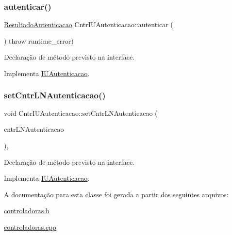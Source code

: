 \subsubsection{\texorpdfstring{autenticar()}{autenticar()}}
{\footnotesize\ttfamily \hyperlink{class_resultado_autenticacao}{Resultado\+Autenticacao} Cntr\+I\+U\+Autenticacao\+::autenticar (\begin{DoxyParamCaption}{ }\end{DoxyParamCaption}) throw  runtime\+\_\+error) \hspace{0.3cm}{\ttfamily [virtual]}}

Declaração de método previsto na interface. 

Implementa \hyperlink{class_i_u_autenticacao_ac963b141bda437bfd3ac425e9e6b9898}{I\+U\+Autenticacao}.

\mbox{\label{class_cntr_i_u_autenticacao_a4ee05cc87ef8cf13e9ba6a3390ac1943}} 
\subsubsection{\texorpdfstring{set\+Cntr\+L\+N\+Autenticacao()}{setCntrLNAutenticacao()}}
{\footnotesize\ttfamily void Cntr\+I\+U\+Autenticacao\+::set\+Cntr\+L\+N\+Autenticacao (\begin{DoxyParamCaption}\item[{\hyperlink{class_i_l_n_autenticacao}{I\+L\+N\+Autenticacao} $\ast$}]{cntr\+L\+N\+Autenticacao }\end{DoxyParamCaption})\hspace{0.3cm}{\ttfamily [inline]}, {\ttfamily [virtual]}}

Declaração de método previsto na interface. 

Implementa \hyperlink{class_i_u_autenticacao_afaa4e4980ee10e2faaecb9ccfe524c61}{I\+U\+Autenticacao}.



A documentação para esta classe foi gerada a partir dos seguintes arquivos\+:\begin{DoxyCompactItemize}
\item 
\hyperlink{controladoras_8h}{controladoras.\+h}\item 
\hyperlink{controladoras_8cpp}{controladoras.\+cpp}\end{DoxyCompactItemize}
